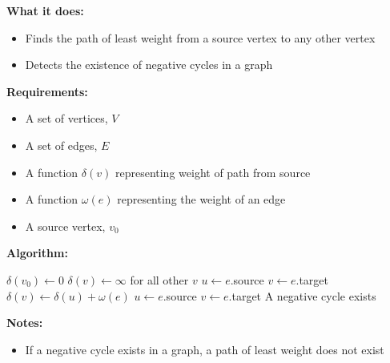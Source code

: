 \textbf{What it does:}
\begin{itemize}
    \item Finds the path of least weight from a source vertex to any other vertex
    \item Detects the existence of negative cycles in a graph
\end{itemize}
\textbf{Requirements:}
\begin{itemize}
    \item A set of vertices, $V$
    \item A set of edges, $E$
    \item A function $\delta(v)$ representing weight of path from source
    \item A function $\omega(e)$ representing the weight of an edge
    \item A source vertex, $v_0$
\end{itemize}
\textbf{Algorithm:}
\begin{algorithmic}[1]
    \STATE $\delta(v_0) \gets 0$
    \STATE $\delta(v) \gets \infty$ for all other $v$
            \STATE $u \gets e$.source
            \STATE $v \gets e$.target
                \STATE $\delta(v) \gets \delta(u) + \omega(e)$
            \ENDIF
        \ENDFOR
    \ENDFOR
        \STATE $u \gets e$.source
        \STATE $v \gets e$.target
            \STATE A negative cycle exists    
        \ENDIF
    \ENDFOR
\end{algorithmic}
\textbf{Notes:}
\begin{itemize}
    \item If a negative cycle exists in a graph, a path of least weight does not exist
\end{itemize}
